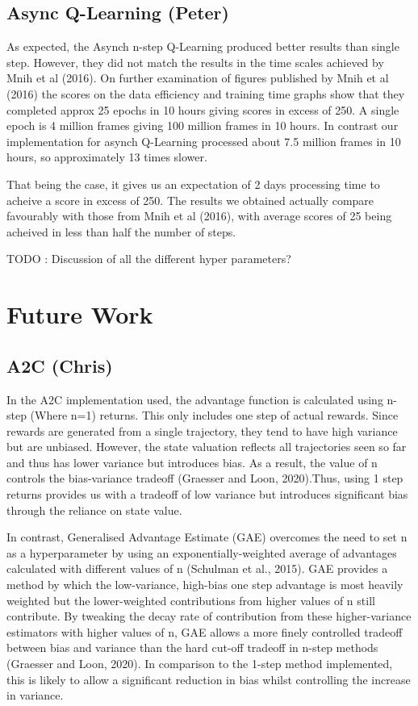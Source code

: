 \documentclass{article}
\begin{document}
\subsection{Async Q-Learning (Peter)}

As expected, the Asynch n-step Q-Learning produced better results than single step. However, they did not match the results in the time scales achieved by Mnih et al (2016). On further examination of figures published by Mnih et al (2016) the scores on the data efficiency and training time graphs show that they completed approx 25 epochs in 10 hours giving scores in excess of 250. A single epoch is 4 million frames giving 100 million frames in 10 hours. In contrast our implementation for asynch Q-Learning processed about 7.5 million frames in 10 hours, so approximately 13 times slower. 

That being the case, it gives us an expectation of 2 days processing time to acheive a score in excess of 250. The results we obtained actually compare favourably with those from Mnih et al (2016), with average scores of 25 being acheived in less than half the number of steps.

TODO : Discussion of all the different hyper parameters?

\section{Future Work}


\subsection{A2C (Chris)}

In the A2C implementation used, the advantage function is calculated using n-step (Where n=1) returns. This only includes one step of actual rewards. Since rewards are generated from a single trajectory, they tend to have high variance but are unbiased. However, the state valuation reflects all trajectories seen so far and thus has lower variance but introduces bias. As a result, the value of n controls the bias-variance tradeoff (Graesser and Loon, 2020).Thus, using 1 step returns provides us with a tradeoff of low variance but introduces significant bias through the reliance on state value.

In contrast, Generalised Advantage Estimate (GAE) overcomes the need to set n as a hyperparameter by using an exponentially-weighted average of advantages calculated with different values of n (Schulman et al., 2015). GAE provides a method by which the low-variance, high-bias one step advantage is most heavily weighted but the lower-weighted contributions from higher values of n still contribute. By tweaking the decay rate of contribution from these higher-variance estimators with higher values of n, GAE allows a more finely controlled tradeoff between bias and variance than the hard cut-off tradeoff in n-step methods (Graesser and Loon, 2020). In comparison to the 1-step method implemented, this is likely to allow a significant reduction in bias whilst controlling the increase in variance.
\end{document}
